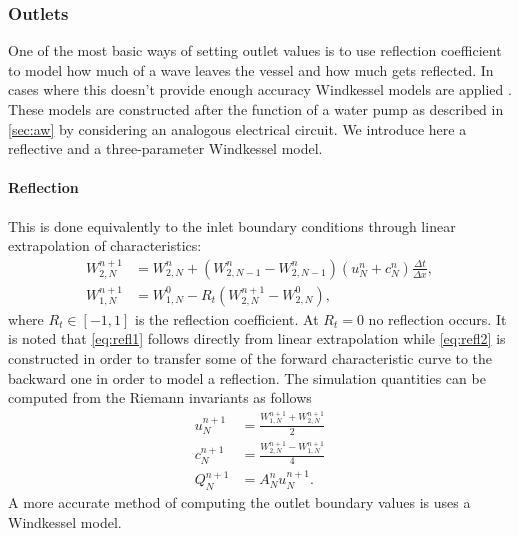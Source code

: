 \documentclass[a4paper, oneside]{discothesis}
\begin{document}
	\subsubsection{Outlets} \label{sssec:outl}
	One of the most basic ways of setting outlet values is to use reflection coefficient to model how much of a wave leaves the vessel and how much gets reflected.
	In cases where this doesn't provide enough accuracy Windkessel models are applied \cite {formaggia2010cardiovascular}.
	These models are constructed after the function of a water pump as described in \autoref{sec:aw} by considering an analogous electrical circuit.
	We introduce here a reflective and a three-parameter Windkessel model.

	\paragraph{Reflection} \label{par:refl}
	This is done equivalently to the inlet boundary conditions through linear extrapolation of characteristics:
	\begin{align}
		W_{2,N}^{n+1}&=W_{2,N}^n+(W_{2,N-1}^n-W_{2,N-1}^n) (u_N^n+c_N^n) \frac{\Delta t}{\Delta x}, \label{eq:refl1} \\
		W_{1,N}^{n+1}&=W_{1,N}^0-R_t (W_{2,N}^{n+1}-W_{2,N}^0) \label{eq:refl2},
	\end{align}
	where $R_t \in [-1,1]$ is the reflection coefficient.
	At $R_t = 0$ no reflection occurs.
	It is noted that \autoref{eq:refl1} follows directly from linear extrapolation while \autoref{eq:refl2} is constructed in order to transfer some of the forward characteristic curve to the backward one in order to model a reflection.
	The simulation quantities can be computed from the Riemann invariants as follows
	\begin{align}
		u_N^{n+1} &= \frac{W_{1,N}^{n+1} + W_{2,N}^{n+1}}{2} \\
		c_N^{n+1} &= \frac{W_{2,N}^{n+1} - W_{1,N}^{n+1}}{4} \\
		Q_N^{n+1} &= A_N^n u_N^{n+1}.
	\end{align}
	A more accurate method of computing the outlet boundary values is uses a Windkessel model.
\end{document}
